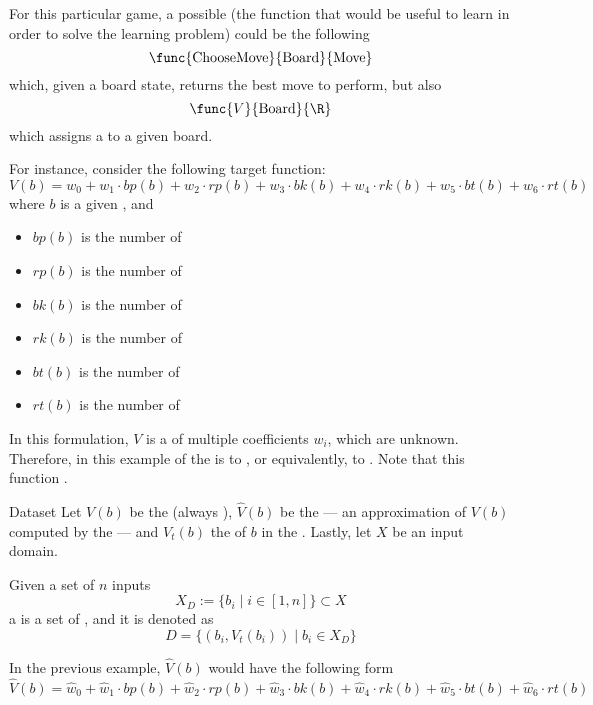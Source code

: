 \documentclass[a4paper, 12pt]{report}
\begin{document}
    For this particular game, a possible  (the function that would be useful to learn in order to solve the learning problem) could be the following $$\func{\mathrm{ChooseMove}}{\mathrm{Board}}{\mathrm{Move}}$$ which, given a board state, returns the best move to perform, but also $$\func{V}{\mathrm{Board}}{\R}$$ which assigns a  to a given board.

    For instance, consider the following target function: $$V(b) = w_0 + w_1 \cdot bp(b) + w_2 \cdot rp(b) + w_3 \cdot bk(b) + w_4 \cdot rk(b) + w_5 \cdot bt(b) + w_6 \cdot rt(b)$$ where $b$ is a given , and

    \begin{itemize}
        \item $bp(b)$ is the number of 
        \item $rp(b)$ is the number of 
        \item $bk(b)$ is the number of 
        \item $rk(b)$ is the number of 
        \item $bt(b)$ is the number of 
        \item $rt(b)$ is the number of 
    \end{itemize}

    In this formulation, $V$ is a  of multiple coefficients $w_i$, which are unknown. Therefore, in this example  of the  is to , or equivalently, to . Note that this function .
    
    \begin{frameddefn}{Dataset}
        Let $V(b)$ be the  (always ), $\hat V(b)$ be the  --- an approximation of $V(b)$ computed by the  --- and $V_t(b)$ the  of $b$ in the . Lastly, let $X$ be an input domain.

        Given a set of $n$ inputs $$X_D := \{b_i \mid i \in [1, n]\} \subset X$$ a  is a set of , and it is denoted as $$D = \{(b_i, V_t(b_i)) \mid b_i \in X_D\}$$
    \end{frameddefn}

    In the previous example, $\hat V(b)$ would have the following form $$\hat V(b) = \hat w_0 + \hat w_1 \cdot bp(b) + \hat w_2 \cdot rp(b) + \hat w_3 \cdot bk(b) + \hat w_4 \cdot rk(b) + \hat w_5 \cdot bt(b) + \hat w_6 \cdot rt(b)$$
\end{document}
